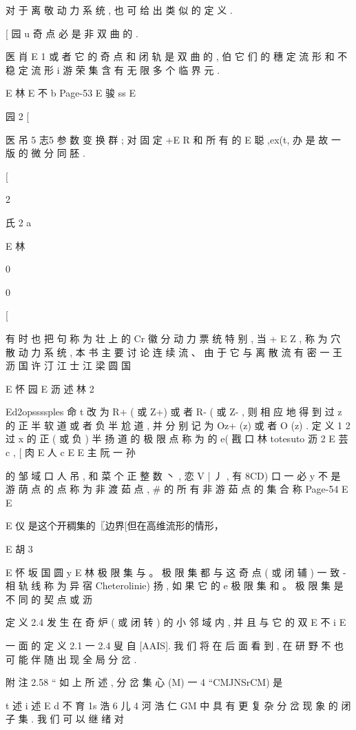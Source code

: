 对 于 离 敬 动 力 系 统 , 也 可 给 出 类 似 的 定 义 .

[ 园 u
奇 点 必 是 非 双 曲 的 .

医 肖
E 1
或 者 它 的 奇 点 和 闭 轨 是 双 曲 的 , 伯 它 们 的 穗 定 流 形 和 不 稳 定 流 形
i
游 荣 集 含 有 无 限 多 个 临 界 元 .

E 林
E 不 b
Page-53
E 骏 ss E

园 2 [

医 吊 5 志5
参 数 变 换 群 ; 对 固 定 +E R 和 所 有 的 E 聪 ,ex(t, 办 是 故 一 版 的
微 分 同 胚 .

[

2

氏 2 a

E 林

0

0

[

有 时 也 把 句 称 为 壮 上 的 Cr 徽 分 动 力 票 统 特 别 , 当 + E Z ,
称 为 穴 散 动 力 系 统 , 本 书 主 要 讨 论 连 续 流 、 由 于 它 与 离 散 流 有 密
一 王 沥 国 许 汀 江 士 江 梁 圆 国

E 怀 园
E 沥 述 林 2

Ed2opssssples 命 t
改 为 R+ ( 或 Z+) 或 者 R- ( 或 Z- , 则 相 应 地 得 到 过 z 的 正 半 软 道
或 者 负 半 尬 道 , 并 分 别 记 为 Oz+ (z) 或 者 O (z) .
定 义 1 2 过 x 的 正 ( 或 负 ) 半 扬 道 的 极 限 点 称 为 的 e( 戡 口
林 totesuto 沥 2
E 芸 c ,
[ 肉
E 人 c
E
E 主 阮 一 孙

的 邹 域 口 人 吊 , 和 菜 个 正 整 数 丶 , 恋 V | 丿 , 有 8CD) 口 一
必 y 不 是 游 荫 点 的 点 称 为 非 渡 茹 点 , # 的 所 有 非 游 茹 点 的 集 合 称
Page-54
E E

E 仪 是这个开稠集的〖边界[但在高维流形的情形，

E 胡 3

E 怀 坂 国 圆 y
E 林
极 限 集 与 。 极 限 集 都 与 这 奇 点 ( 或 闭 辅 ) 一 致 - 相 轨 线 称 为 异 宿
Cheterolinie) 扬 , 如 果 它 的 e 极 限 集 和 。 极 限 集 是 不 同 的 契 点 或
沥

定 义 2.4 发 生 在 奇 炉 ( 或 闭 转 ) 的 小 邻 域 内 , 并 且 与 它 的 双
E 不
i
E

一 面 的 定 义 2.1 一 2.4 叟 自 [AAIS]. 我 们 将 在 后 面 看 到 , 在 研
野 不
也 可 能 伴 随 出 现 全 局 分 岔 .

附 注 2.58 “ 如 上 所 述 , 分 岔 集 心 (M) 一 4 “CMJNSrCM) 是

t 述 i 述
E d 不 育 1s 浩 6 儿 4 河 浩
仁 GM 中 具 有 更 复 杂 分 岔 现 象 的 闭 子 集 . 我 们 可 以 继 绪 对

